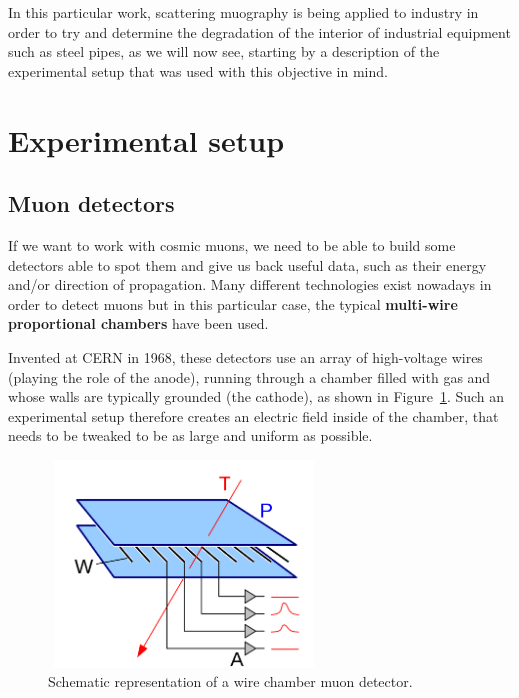 \documentclass[a4paper, 11pt]{report}
\begin{document}
In this particular work, scattering muography is being applied to industry in order to try and determine the degradation of the interior of industrial equipment such as steel pipes, as we will now see, starting by a description of the experimental setup that was used with this objective in mind.

\section{Experimental setup} \label{sec:setup}

\subsection{Muon detectors} \label{sec:muonDetectors}

If we want to work with cosmic muons, we need to be able to build some detectors able to spot them and give us back useful data, such as their energy and/or direction of propagation. Many different technologies exist nowadays in order to detect muons but in this particular case, the typical \textbf{multi-wire proportional chambers} have been used.

Invented at CERN in 1968, these detectors use an array of high-voltage wires (playing the role of the anode), running through a chamber filled with gas and whose walls are typically grounded (the cathode), as shown in Figure~\ref{fig:wireChambers}. Such an experimental setup therefore creates an electric field inside of the chamber, that needs to be tweaked to be as large and uniform as possible.

\begin{figure}[htbp]
\begin{center}
\includegraphics[width=7.2cm, height=5.5cm]{figs/wireChambers.png}
\caption{Schematic representation of a wire chamber muon detector.}
\label{fig:wireChambers}
\end{center}
\end{figure}
\end{document}
